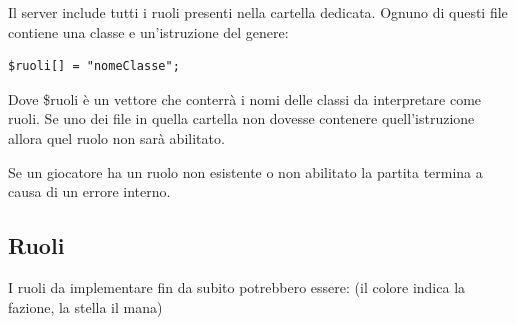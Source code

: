\documentclass[10pt,a4paper]{article}
\begin{document}
Il server include tutti i ruoli presenti nella cartella dedicata. Ognuno di questi file contiene una classe e un'istruzione del genere:
\begin{verbatim}
$ruoli[] = "nomeClasse";
\end{verbatim}

Dove \textsf{\$ruoli} è un vettore che conterrà i nomi delle classi da interpretare come ruoli. Se uno dei file in quella cartella non dovesse contenere quell'istruzione allora quel ruolo non sarà abilitato.

Se un giocatore ha un ruolo non esistente o non abilitato la partita termina a causa di un errore interno.

\subsection{Ruoli}
I ruoli da implementare fin da subito potrebbero essere: (il colore indica la fazione, la stella il mana)
\end{document}
